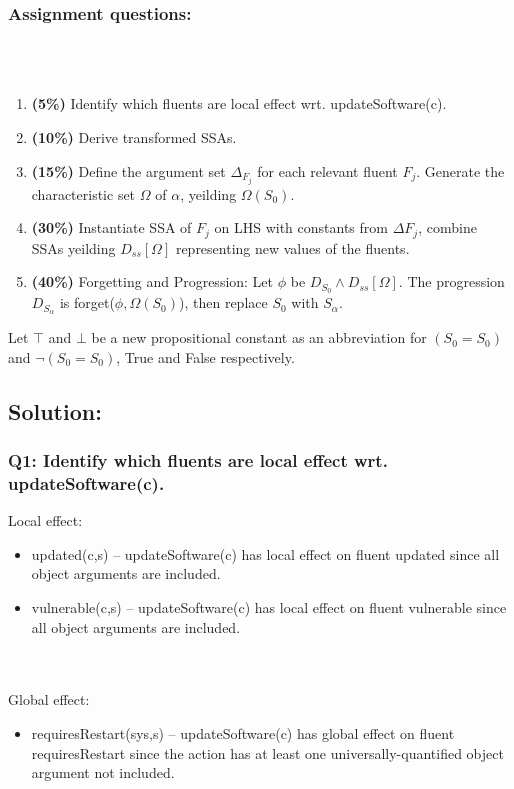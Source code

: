 \documentclass{assignment}
\begin{document}
\begin{problem}
\subsubsection*{Assignment questions:}
\\\\
\begin{enumerate}
    \item {\textbf{(5\%)}} Identify which fluents are local effect wrt. updateSoftware(c).\\
\item {\textbf{(10\%)}} Derive transformed SSAs.\\
\item {\textbf{(15\%)}} Define the argument set $\Delta_F_j$ for each relevant fluent $F_j$. Generate the characteristic set $\Omega$ of $\alpha$, yeilding $\Omega(S_0)$.\\
\item {\textbf{(30\%)}} Instantiate SSA of $F_j$ on LHS with constants from $\Delta F_j$, combine SSAs yeilding $D_{ss}[\Omega]$ representing new values of the fluents.\\
\item {\textbf{(40\%)}} Forgetting and Progression: Let $\phi$ be $D_{S_0} \land D_{ss}[\Omega]$. The progression $D_{S_\alpha}$ is forget($\phi, \Omega(S_0)$), then replace $S_0$ with $S_\alpha$.\\
\end{enumerate}
Let $\top$ and $\bot$ be a new propositional constant as an abbreviation for $(S_0=S_0)$ and $\neg(S_0=S_0)$, True and False respectively.

\subsection*{Solution:}

\subsubsection*{Q1: Identify which fluents are local effect wrt. updateSoftware(c).}

Local effect:
\begin{itemize}
    \item updated(c,s) -- updateSoftware(c) has local effect on fluent updated since all object arguments are included.
    \item vulnerable(c,s) -- updateSoftware(c) has local effect on fluent vulnerable since all object arguments are included.
\end{itemize}
\\\\
Global effect:
\begin{itemize}
    \item requiresRestart(sys,s) -- updateSoftware(c) has global effect on fluent requiresRestart since the action has at least one universally-quantified object argument not included.
\end{itemize}


\end{problem}
\end{document}
